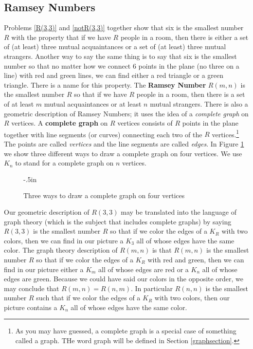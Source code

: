 \subsection{Ramsey Numbers}\label{Ramseysection}
Problems \ref{R(3,3)} and \ref{notR(3,3)}  together show that six is the
smallest number $R$ with the property that if we have $R$ people in a room,
then there is either a set of (at least) three mutual acquaintances or a
set of (at least) three mutual strangers.  Another way to say the same
thing is to say that six is the smallest number so that no matter how we
connect 6 points in the plane (no three on a line) with red and green lines,
we can find either a red triangle or a green triangle.  There is a name for
this property.  The {\bf Ramsey Number} $R(m,n)$ is the smallest number $R$
so that if we have $R$ people in a room, then there is a set of at least $m$
mutual acquaintances or at least $n$ mutual strangers.  There is also a
geometric description of Ramsey Numbers; it uses the idea of a {\em complete
graph}  on $R$ vertices.  A {\bf complete graph} on $R$
vertices consists of $R$ points in the plane together with line segments (or
curves) connecting each two of the $R$ vertices.\footnote{As you may have
guessed, a complete graph is a special case of something called a graph. 
THe word graph will be defined in Section \ref{graphsection}.} The points are
called {\em vertices} and the line
segments are called {\em edges}. In
Figure
\ref{completegraph} we show three different ways to draw a complete graph on
four vertices.  We use $K_n$ to stand for a complete graph on $n$ vertices.

\begin{figure}[htb]\caption{Three ways to draw a
complete graph on four vertices}\label{completegraph}\vglue-1in
\begin{center}\vglue-.5in\mbox{}
\end{center}
\end{figure}

Our geometric description of $R(3,3)$ may be translated into the language
of graph theory (which is the subject that includes complete graphs) by
saying $R(3,3)$ is the smallest number $R$ so that if we color the edges of a
$K_R$ with two colors, then we can find in our picture a
$K_3$  all of whose edges have the same color.  
The graph theory description of $R(m,n)$ is that $R(m,n)$ is the smallest
number $R$ so that if we color the edges of a $K_R$ with red and
green, then we can find in our picture either a $K_m$ all of whose edges are
red or a
$K_n$ all of whose edges are green.  Because we could have said our colors in
the opposite order, we may conclude that $R(m,n) = R(n,m)$.  In particular
$R(n,n)$ is the smallest number $R$ such that if we color the edges of a
$K_R$ with two colors, then our picture contains a $K_n$ all of whose edges
have the same color. 


